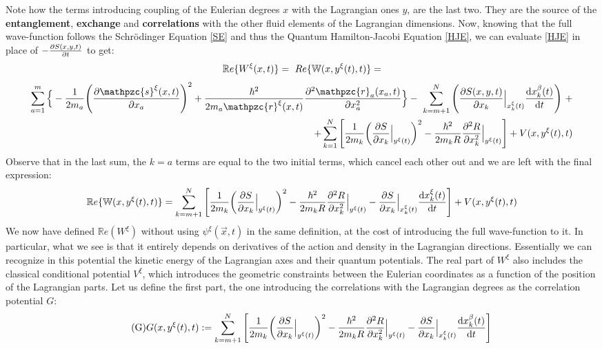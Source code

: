 \documentclass[11pt, a4paper]{article} %
\newcommand{\R}{\mathbb{R}} %
\newcommand{\z}{\mathpzc{s}}
\newcommand{\p}{\mathpzc{r}}
\newcommand{\W}{\mathbb{W}}
\begin{document}
Note how the terms introducing coupling of the Eulerian degrees $x$ with the Lagrangian ones $y$, are the last two. They are the source of the {\bf entanglement}, {\bf exchange} and {\bf correlations} with the other fluid elements of the Lagrangian dimensions. Now, knowing that the full wave-function follows the Schrödinger Equation \eqref{SE} and thus the Quantum Hamilton-Jacobi Equation \eqref{HJE}, we can evaluate \eqref{HJE} in place of $-\pdv{S(x,y,t)}{t}$ to get:\vspace{-0.2cm}
$$
\R e\{W^\xi(x,t)\}=\ Re\{\W(x, y^\xi(t),t)\}=\vspace{-0.14cm}
$$
\begin{equation*}
\begin{split}
\sum_{a=1}^m\Big\{-\frac{1}{2m_a} \qty(\pdv{\z^\xi(x,t)}{x_a})^2 +\frac{\hbar^2}{2m_a\p^\xi(x,t)}\pdv[2]{\p_a(x_a, t)}{x_a}\Big\}- \ \sum_{k=m+1}^N \qty( \pdv{S(x,y,t)}{x_k}\Big\rvert_{x_k^\xi(t)} \dv{x_k^\beta(t)}{t})\ + \\ \ +\sum_{k=1}^N \qty[\frac{1}{2m_k} \qty(\pdv{S}{x_k}\Big\rvert_{y^\xi(t)})^2 -\frac{\hbar^2}{2m_kR}\pdv[2]{R}{x_k}\Big\rvert_{y^\xi(t)} ] + V(x, y^\xi(t),t)
\end{split}
\end{equation*}
Observe that in the last sum, the $k=a$ terms are equal to the two initial terms, which cancel each other out and we are left with the final expression:\vspace{-0.3cm}\label{ReW}
\begin{equation*}
\R e\{\W(x, y^\xi(t),t)\}= \sum_{k=m+1}^N \qty[\frac{1}{2m_k} \qty(\pdv{S}{x_k}\Big\rvert_{y^\xi(t)})^2 -\frac{\hbar^2}{2m_kR}\pdv[2]{R}{x_k}\Big\rvert_{y^\xi(t)} -\pdv{S}{x_k}\Big\rvert_{x_k^\xi(t)} \dv{x_k^\xi(t)}{t} ] + V(x, y^\xi(t),t)
\end{equation*}
We now have defined $\R e(W^\xi)$ without using $\psi^\xi(\vec{x},t)$ in the same definition, at the cost of introducing the full wave-function to it. In particular, what we see is that it entirely depends on derivatives of the action and density in the Lagrangian directions. Essentially we can recognize in this potential the kinetic energy of the Lagrangian axes and their quantum potentials. The real part of $W^\xi$ also includes the classical conditional potential $V^\xi$, which introduces the geometric constraints between the Eulerian coordinates as a function of the position of the Lagrangian parts. Let us define the first part, the one introducing the correlations with the Lagrangian degrees as the correlation potential $G$:
\begin{equation}\label{G}\tag{G}
G(x, y^\xi(t),t):=  \sum_{k=m+1}^N \qty[\frac{1}{2m_k} \qty(\pdv{S}{x_k}\Big\rvert_{y^\xi(t)})^2 -\frac{\hbar^2}{2m_kR}\pdv[2]{R}{x_k}\Big\rvert_{y^\xi(t)} -\pdv{S}{x_k}\Big\rvert_{x_k^\xi(t)} \dv{x_k^\beta(t)}{t} ]
\end{equation}
\end{document}

